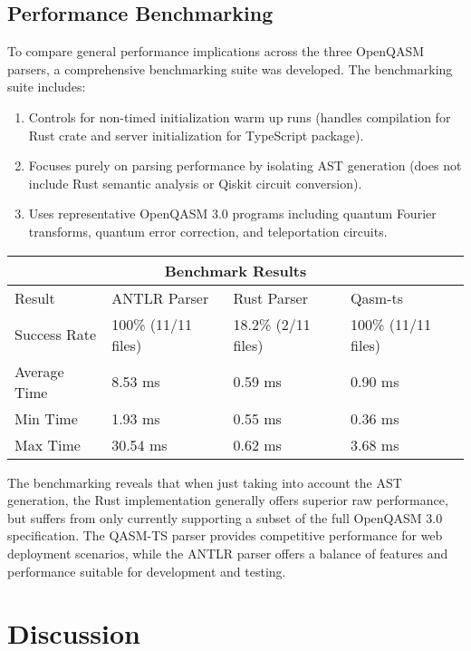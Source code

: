 \documentclass{article}
\begin{document}
\subsection{Performance Benchmarking}

To compare general performance implications across the three OpenQASM parsers, a comprehensive benchmarking suite was developed. The benchmarking suite includes:

\begin{enumerate}
    \item Controls for non-timed initialization warm up runs (handles compilation for Rust crate and server initialization for TypeScript package).
    \item Focuses purely on parsing performance by isolating AST generation (does not include Rust semantic analysis or Qiskit circuit conversion).
    \item Uses representative OpenQASM 3.0 programs including quantum Fourier transforms, quantum error correction, and teleportation circuits.
\end{enumerate}

\noindent \begin{tabular}{ |p{3cm}|p{3cm}|p{3cm}|p{3cm}|  }
 \hline
 \multicolumn{4}{|c|}{Benchmark Results} \\
 \hline
 Result& ANTLR Parser&Rust Parser&Qasm-ts\\
 \hline
 Success Rate&100\% (11/11 files)&18.2\% (2/11 files)&100\% (11/11 files)\\
 Average Time&8.53 ms&0.59 ms&0.90 ms\\
 Min Time&1.93 ms&0.55 ms&0.36 ms\\
 Max Time&30.54 ms&0.62 ms&3.68 ms\\
 \hline
\end{tabular}

\vspace{5mm}

The benchmarking reveals that when just taking into account the AST generation, the Rust implementation generally offers superior raw performance, but suffers from only currently supporting a subset of the full OpenQASM 3.0 specification. The QASM-TS parser provides competitive performance for web deployment scenarios, while the ANTLR parser offers a balance of features and performance suitable for development and testing.

\section{Discussion}
\end{document}
